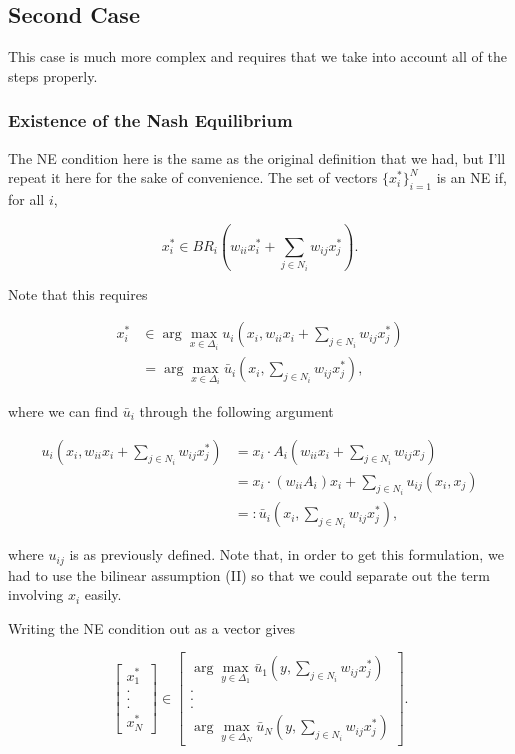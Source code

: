\documentclass{article}
\theoremstyle{definition}
\begin{document}
	\subsection*{Second Case}
	
	This case is much more complex and requires that we take into account all of the steps properly.
	
	\subsubsection*{Existence of the Nash Equilibrium}
	
	The NE condition here is the same as the original definition that we had, but I'll repeat it here for the sake of convenience. The set of vectors $\{ x_i^*\}_{i = 1}^N$ is an NE if, for all $i$,
	
	\begin{equation*}
		x_i^* \in BR_i( w_{ii} x_i^* + \sum_{j \in N_i} w_{ij} x_j^*).
	\end{equation*}
	
	Note that this requires
	
	\begin{align}
		x_i^* &\in \arg\max_{x \in \Delta_i} u_i(x_i, w_{ii} x_i + \sum_{j \in N_i} w_{ij} x_j^*) \nonumber\\
		&= \arg\max_{x \in \Delta_i} \bar{u}_i(x_i, \sum_{j \in N_i} w_{ij} x_j^*),
	\end{align}

	where we can find $\bar{u}_i$ through the following argument
	
	\begin{align}
		u_i(x_i, w_{ii} x_i + \sum_{j \in N_i} w_{ij} x_j^*) & = x_i \cdot A_i (w_{ii} x_i + \sum_{j \in N_i} w_{ij} x_j) \\
		 & = x_i \cdot (w_{ii} A_i)  x_i + \sum_{j \in N_i} u_{ij}(x_i, x_j) \\
		 & =: \bar{u}_i(x_i, \sum_{j \in N_i} w_{ij} x_j^*), \nonumber
	\end{align}
	
	where $u_{ij}$ is as previously defined. Note that, in order to get this formulation, we had to use the bilinear assumption (II) so that we could separate out the term involving $x_i$ easily. 
	
	Writing the NE condition out as a vector gives
	
	\begin{equation}
		\begin{bmatrix}
			x_1^* \\ . \\ . \\ . \\ x_N^*
		\end{bmatrix} \in
		\begin{bmatrix}
		\arg\max_{y \in \Delta_1} \bar{u}_1(y, \sum_{j \in N_i} w_{ij} x_j^*) \\ . \\ . \\ . \\ \arg\max_{y \in \Delta_N} \bar{u}_N(y, \sum_{j \in N_i} w_{ij} x_j^*)
		\end{bmatrix}	.
	\end{equation}
\end{document}
